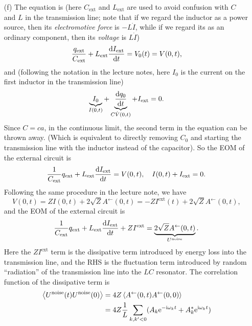 \documentclass[hyperref, a4paper]{article}
\newcommand*{\ii}{\mathrm{i}}
\newcommand*{\ee}{\mathrm{e}}
\begin{document}
\begin{itemize}
\item[(f)] The equation is 
(here $C_{\text{ext}}$ and $L_{\text{ext}}$ are used to avoid confusion with $C$ and $L$ in the transmission line;
note that if we regard the inductor as a power source, 
then its \emph{electromotive force} is $- L \dot{I}$,
while if we regard its as an ordinary component,
then its \emph{voltage} is $L \dot{I}$)
\begin{equation}
    \frac{q_{\text{ext}}}{C_{\text{ext}}} + L_{\text{ext}} \dv{I_{\text{ext}}}{t} = V_0(t) = V(0, t),
\end{equation}
and (following the notation in the lecture notes,
here $I_0$ is the current on the first inductor in the transmission line)
\begin{equation}
    \underbrace{I_0}_{I(0, t)} + \underbrace{\dv{q_0}{t}}_{C \dot{V}(0, t)} + I_{\text{ext}} = 0.
\end{equation}
Since $C = ca$, in the continuous limit, the second term in the equation can be thrown away.
(Which is equivalent to directly removing $C_0$ and starting the transmission line with 
the inductor instead of the capacitor).
So the EOM of the external circuit is 
\begin{equation}
    \frac{1}{C_{\text{ext}}} q_{\text{ext}} + L_{\text{ext}} \dv{I_{\text{ext}}}{t} = V(0, t),
    \quad I(0, t) + I_{\text{ext}} = 0.
\end{equation}
Following the same procedure in the lecture note,
we have 
\begin{equation}
    V(0, t) = Z I(0, t) + 2 \sqrt{Z} A^{\leftarrow}(0, t)
    = - Z I^{\text{ext}}(t) + 2\sqrt{Z} A^{\leftarrow}(0, t),
\end{equation}
and the EOM of the external circuit is 
\begin{equation}
    \frac{1}{C_{\text{ext}}} q_{\text{ext}} + L_{\text{ext}} \dv{I_{\text{ext}}}{t} + Z I^{\text{ext}}
    = \underbrace{2 \sqrt{Z} A^{\leftarrow}(0, t)}_{U^{\text{noise}}}.
\end{equation}
Here the $Z I^{\text{ext}}$ term is the dissipative term introduced by 
energy loss into the transmission line,
and the RHS is the fluctuation term introduced by random ``radiation''
of the transmission line into the $LC$ resonator.
The correlation function of the dissipative term is 
\[
    \begin{aligned}
        \expval{U^{\text{noise}}(t) U^{\text{noise}}(0)} &= 4Z \expval{A^{\leftarrow}(0, t) A^{\leftarrow}(0, 0)} \\
        &= 4 Z \frac{1}{L} \sum_{k, k' < 0} (A_k \ee^{- \ii \omega_k t} + A_k^* \ee^{\ii \omega_k t})

\end{aligned}\]
\end{itemize}
\end{document}
